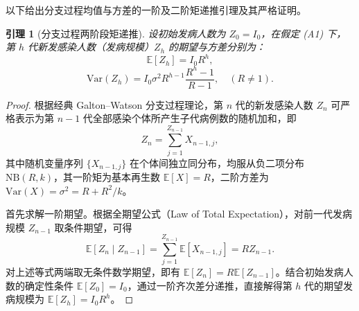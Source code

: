 \documentclass[11pt,a4paper]{article}
\theoremstyle{plain}
\newtheorem{lemma}{引理}
\theoremstyle{definition}
\begin{document}
以下给出分支过程均值与方差的一阶及二阶矩递推引理及其严格证明。

\begin{lemma}[分支过程两阶段矩递推]\label{lem:branch_moments}
设初始发病人数为 $Z_0 = I_0$，在假定 (A1) 下，第 $h$ 代新发感染人数（发病规模）$Z_h$ 的期望与方差分别为：
\begin{equation}
\mathbb{E}[Z_h] = I_0 R^h,
\end{equation}
\begin{equation}
\text{Var}(Z_h) = I_0 \sigma^2 R^{h-1} \frac{R^h - 1}{R - 1}, \quad (R \neq 1).
\label{eq:lem1_var}
\end{equation}
\end{lemma}

\begin{proof}
根据经典 Galton--Watson 分支过程理论\citep{athreya1972branching}，第 $n$ 代的新发感染人数 $Z_n$ 可严格表示为第 $n-1$ 代全部感染个体所产生子代病例数的随机加和，即
\begin{equation}
Z_n = \sum_{j=1}^{Z_{n-1}} X_{n-1, j},
\end{equation}
其中随机变量序列 $\{X_{n-1, j}\}$ 在个体间独立同分布，均服从负二项分布 $\text{NB}(R, k)$，其一阶矩为基本再生数 $\mathbb{E}[X] = R$，二阶方差为 $\text{Var}(X) = \sigma^2 = R + R^2/k$。

首先求解一阶期望。根据全期望公式（Law of Total Expectation），对前一代发病规模 $Z_{n-1}$ 取条件期望，可得
\begin{equation}
\mathbb{E}[Z_n \mid Z_{n-1}] = \sum_{j=1}^{Z_{n-1}} \mathbb{E}[X_{n-1, j}] = R Z_{n-1}.
\end{equation}
对上述等式两端取无条件数学期望，即有 $\mathbb{E}[Z_n] = R \mathbb{E}[Z_{n-1}]$。结合初始发病人数的确定性条件 $\mathbb{E}[Z_0] = I_0$，通过一阶齐次差分递推，直接解得第 $h$ 代的期望发病规模为 $\mathbb{E}[Z_h] = I_0 R^h$。


\end{proof}
\end{document}
